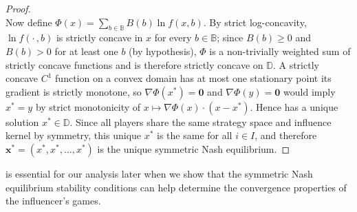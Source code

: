 \documentclass{article}
\begin{document}
\begin{proof}
\begin{equation}
                    \end{equation}
                    Now define $\Phi(x) = \sum_{b\in\mathbb{B}} B(b)\ln f(x,b)$. By strict log-concavity, $\ln f(\cdot\,,b)$ is strictly concave in $x$ for every $b\in\mathbb{B}$; since $B(b)\geq 0$ and $B(b)>0$ for at least one $b$ (by hypothesis), $\Phi$ is a non-trivially weighted sum of strictly concave functions and is therefore strictly concave on $\mathbb{D}$. A strictly concave $C^1$ function on a convex domain has at most one stationary point its gradient is strictly monotone, so $\nabla\Phi(x^*)=\mathbf{0}$ and $\nabla\Phi(y)=\mathbf{0}$ would imply $x^* = y$ by strict monotonicity of $x\mapsto \nabla\Phi(x)\cdot(x-x^*)$. Hence  has a unique solution $x^* \in \mathbb{D}$. Since all players share the same strategy space and influence kernel by symmetry, this unique $x^*$ is the same for all $i \in I$, and therefore $\mathbf{x}^* = (x^*, x^*, \dots, x^*)$ is the unique symmetric Nash equilibrium.
                \end{proof}
              is essential for our analysis later when we show that the symmetric Nash equilibrium stability conditions can help determine the convergence properties of the influencer's games. 
             
\end{document}

